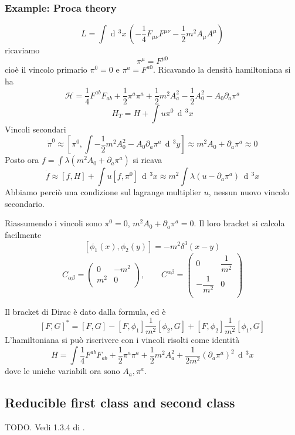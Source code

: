 \documentclass[a4paper, 11pt]{article}
\newcommand{\dd}{\mathop{\mathrm{d}\!}{}}
\begin{document}
	\subsubsection{Example: Proca theory}
	\[ L = \int \dd^3 x\, \left(-\dfrac{1}{4} F_{\mu\nu}F^{\mu\nu} - \dfrac{1}{2} m^2 A_\mu A^\mu \right) \]
	ricaviamo
	\[ \pi^\mu = F^{\mu 0} \]
	cioè il vincolo primario $\pi^0=0$ e $\pi^a = F^{a0}$. Ricavando la densità hamiltoniana si ha
	\[ \mathcal{H} = \dfrac{1}{4} F^{ab}F_{ab} + \dfrac{1}{2} \pi^a\pi^a + \dfrac{1}{2} m^2 A_a^2 - \dfrac{1}{2} A_0^2 - A_0 \partial_a \pi^a \]
	\[ H_T = H + \int u\pi^0\,\dd^3 x \]
	Vincoli secondari
	\[ \dot{\pi}^0 \approx \left[ \pi^0, \int -\dfrac{1}{2} m^2 A_0^2 - A_0 \partial_a \pi^a\,\dd^3 y \right] \approx m^2 A_0 + \partial_a \pi^a \approx 0 \]
	Posto ora $f = \int \lambda \left( m^2 A_0 + \partial_a \pi^a \right)$ si ricava
	\[ \dot{f} \approx [f,H] + \int u [f,\pi^0]\,\dd^3 x \approx m^2 \int \lambda \left(u-\partial_a\pi^a\right)\,\dd^3 x \]
	Abbiamo perciò una condizione sul lagrange multiplier $u$, nessun nuovo vincolo secondario.
	
	Riassumendo i vincoli sono $\pi^0 = 0$, $m^2A_0 + \partial_a \pi^a = 0$. Il loro bracket si calcola facilmente
	\[ [\phi_1(x), \phi_2(y)] = -m^2 \delta^3(x-y) \]
	\[ C_{\alpha\beta} = \begin{pmatrix}
	0 & -m^2 \\
	m^2 & 0 \\
	\end{pmatrix},\qquad
	C^{\alpha\beta} = \begin{pmatrix}
	0 & \dfrac{1}{m^2} \\
	-\dfrac{1}{m^2} & 0 \\
	\end{pmatrix} \]
	
	Il bracket di Dirac è dato dalla formula, ed è
	\[ [F,G]^* = [F,G] - [F,\phi_1]\dfrac{1}{m^2}[\phi_2,G] + [F,\phi_2]\dfrac{1}{m^2}[\phi_1,G] \]
	L'hamiltoniana si può riscrivere con i vincoli risolti come identità
	\[ H = \int \dfrac{1}{4} F^{ab}F_{ab} + \dfrac{1}{2} \pi^a\pi^a + \dfrac{1}{2} m^2 A_a^2 + \dfrac{1}{2m^2} (\partial_a \pi^a)^2\,\dd^3 x \]
	dove le uniche variabili ora sono $A_a,\pi^a$.
	
	\subsection{Reducible first class and second class}
	TODO. Vedi 1.3.4 di \cite{HT}.
	
\end{document}
